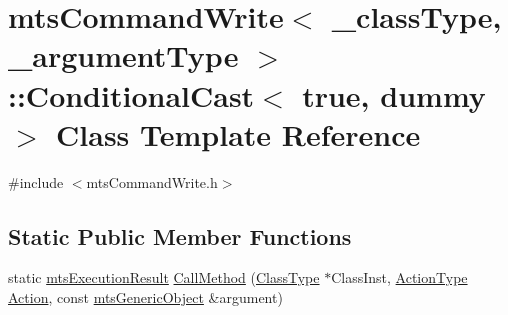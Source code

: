 \hypertarget{classmts_command_write_1_1_conditional_cast_3_01true_00_01dummy_01_4}{\section{mts\-Command\-Write$<$ \-\_\-class\-Type, \-\_\-argument\-Type $>$\-:\-:Conditional\-Cast$<$ true, dummy $>$ Class Template Reference}
\label{classmts_command_write_1_1_conditional_cast_3_01true_00_01dummy_01_4}
}


{\ttfamily \#include $<$mts\-Command\-Write.\-h$>$}

\subsection*{Static Public Member Functions}
\begin{DoxyCompactItemize}
\item 
static \hyperlink{classmts_execution_result}{mts\-Execution\-Result} \hyperlink{classmts_command_write_1_1_conditional_cast_3_01true_00_01dummy_01_4_a266e6d67fbb7171a9234653dbee9cd72}{Call\-Method} (\hyperlink{classmts_command_write_aeccc8c434133c4adae34916b42ad493c}{Class\-Type} $\ast$Class\-Inst, \hyperlink{classmts_command_write_a1327ec4d03afcafbbbd91c8fc3f3c090}{Action\-Type} \hyperlink{classmts_command_write_affee375369797c3ffb3aba6578d33b23}{Action}, const \hyperlink{classmts_generic_object}{mts\-Generic\-Object} \&argument)
\end{DoxyCompactItemize}


